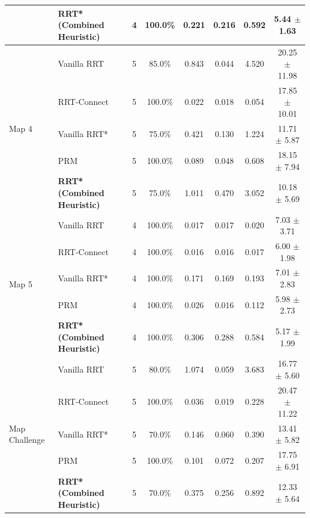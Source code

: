 \begin{table}[t]
\begin{tabular}{llcccccc}
 & \textbf{RRT* (Combined Heuristic)} & 4 & 100.0\% & 0.221 & 0.216 & 0.592 &  5.44 $\pm$ 1.63 \\
\midrule
\multirow{5}{*}{Map 4} & Vanilla RRT & 5 &  85.0\% & 0.843 & 0.044 & 4.520 & 20.25 $\pm$ 11.98 \\
 & RRT-Connect & 5 & 100.0\% & 0.022 & 0.018 & 0.054 & 17.85 $\pm$ 10.01 \\
 & Vanilla RRT* & 5 &  75.0\% & 0.421 & 0.130 & 1.224 & 11.71 $\pm$ 5.87 \\
 & PRM & 5 & 100.0\% & 0.089 & 0.048 & 0.608 & 18.15 $\pm$ 7.94 \\
 & \textbf{RRT* (Combined Heuristic)} & 5 &  75.0\% & 1.011 & 0.470 & 3.052 & 10.18 $\pm$ 5.69 \\
\midrule
\multirow{5}{*}{Map 5} & Vanilla RRT & 4 & 100.0\% & 0.017 & 0.017 & 0.020 &  7.03 $\pm$ 3.71 \\
 & RRT-Connect & 4 & 100.0\% & 0.016 & 0.016 & 0.017 &  6.00 $\pm$ 1.98 \\
 & Vanilla RRT* & 4 & 100.0\% & 0.171 & 0.169 & 0.193 &  7.01 $\pm$ 2.83 \\
 & PRM & 4 & 100.0\% & 0.026 & 0.016 & 0.112 &  5.98 $\pm$ 2.73 \\
 & \textbf{RRT* (Combined Heuristic)} & 4 & 100.0\% & 0.306 & 0.288 & 0.584 &  5.17 $\pm$ 1.99 \\
\midrule
\multirow{5}{*}{Map Challenge} & Vanilla RRT & 5 &  80.0\% & 1.074 & 0.059 & 3.683 & 16.77 $\pm$ 5.60 \\
 & RRT-Connect & 5 & 100.0\% & 0.036 & 0.019 & 0.228 & 20.47 $\pm$ 11.22 \\
 & Vanilla RRT* & 5 &  70.0\% & 0.146 & 0.060 & 0.390 & 13.41 $\pm$ 5.82 \\
 & PRM & 5 & 100.0\% & 0.101 & 0.072 & 0.207 & 17.75 $\pm$ 6.91 \\
 & \textbf{RRT* (Combined Heuristic)} & 5 &  70.0\% & 0.375 & 0.256 & 0.892 & 12.33 $\pm$ 5.64 \\
\bottomrule
\end{tabular}
\end{table}